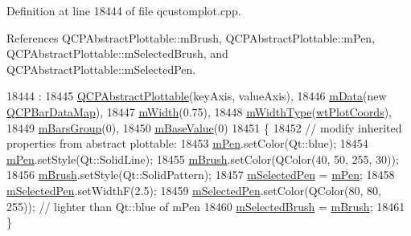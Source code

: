 Definition at line 18444 of file qcustomplot.\+cpp.



References Q\+C\+P\+Abstract\+Plottable\+::m\+Brush, Q\+C\+P\+Abstract\+Plottable\+::m\+Pen, Q\+C\+P\+Abstract\+Plottable\+::m\+Selected\+Brush, and Q\+C\+P\+Abstract\+Plottable\+::m\+Selected\+Pen.


\begin{DoxyCode}
18444                                                      :
18445   \hyperlink{class_q_c_p_abstract_plottable_af78a036e40db6f53a31abadc5323715a}{QCPAbstractPlottable}(keyAxis, valueAxis),
18446   \hyperlink{class_q_c_p_bars_aef28d29d51ef84b608ecd22c55d531ff}{mData}(\textcolor{keyword}{new} \hyperlink{qcustomplot_8h_aa846c77472cae93def9f1609d0c57191}{QCPBarDataMap}),
18447   \hyperlink{class_q_c_p_bars_a7c4e0f2246f8133f48a9c3f24cf5b920}{mWidth}(0.75),
18448   \hyperlink{class_q_c_p_bars_a94dba1309496c7601d01e2c59715cbb3}{mWidthType}(\hyperlink{class_q_c_p_bars_a65dbbf1ab41cbe993d71521096ed4649aad3cc60ae1bfb1160a30237bee9eaf10}{wtPlotCoords}),
18449   \hyperlink{class_q_c_p_bars_a9f59c255f3739182ca9744dff75beaa9}{mBarsGroup}(0),
18450   \hyperlink{class_q_c_p_bars_aa0515cf47fa6044cc28e59b1ae5ec759}{mBaseValue}(0)
18451 \{
18452   \textcolor{comment}{// modify inherited properties from abstract plottable:}
18453   \hyperlink{class_q_c_p_abstract_plottable_a67bc0622fd1b9fa14e54c14922dcec66}{mPen}.setColor(Qt::blue);
18454   \hyperlink{class_q_c_p_abstract_plottable_a67bc0622fd1b9fa14e54c14922dcec66}{mPen}.setStyle(Qt::SolidLine);
18455   \hyperlink{class_q_c_p_abstract_plottable_a33f00674c0161c13315ab9da0895418e}{mBrush}.setColor(QColor(40, 50, 255, 30));
18456   \hyperlink{class_q_c_p_abstract_plottable_a33f00674c0161c13315ab9da0895418e}{mBrush}.setStyle(Qt::SolidPattern);
18457   \hyperlink{class_q_c_p_abstract_plottable_a10619472f5d5e10e9519a599f1cf5576}{mSelectedPen} = \hyperlink{class_q_c_p_abstract_plottable_a67bc0622fd1b9fa14e54c14922dcec66}{mPen};
18458   \hyperlink{class_q_c_p_abstract_plottable_a10619472f5d5e10e9519a599f1cf5576}{mSelectedPen}.setWidthF(2.5);
18459   \hyperlink{class_q_c_p_abstract_plottable_a10619472f5d5e10e9519a599f1cf5576}{mSelectedPen}.setColor(QColor(80, 80, 255)); \textcolor{comment}{// lighter than Qt::blue of mPen}
18460   \hyperlink{class_q_c_p_abstract_plottable_aea3c0da30c7a8be23ad5f2d9bca36762}{mSelectedBrush} = \hyperlink{class_q_c_p_abstract_plottable_a33f00674c0161c13315ab9da0895418e}{mBrush};
18461 \}
\end{DoxyCode}
\hypertarget{class_q_c_p_bars_a4d880e28031ef120603f543379be2f22}{}
